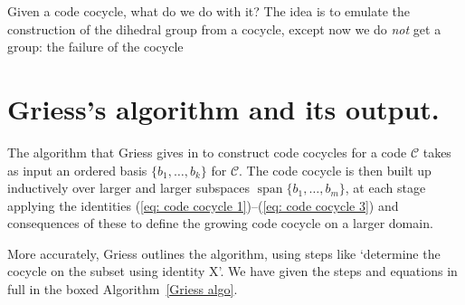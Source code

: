 \documentclass{article}
\theoremstyle{plain}
\theoremstyle{definition}
\def \cC {\mathcal{C}}
\DeclareMathOperator{\Span}{span}
\begin{document}
Given a code cocycle, what do we do with it? 
The idea is to emulate the construction of the dihedral group from a cocycle, except now we do \emph{not} get a group: the failure of the cocycle 

\section{Griess's algorithm and its output.}

The algorithm that Griess gives in \cite[Theorem 10]{Griess} to construct code cocycles for a code $\cC$ takes as input an ordered  basis $\{b_1,\ldots,b_k\}$ for $\cC$. 
The code cocycle is then built up inductively over larger and larger subspaces $\Span\{b_1,\ldots,b_m\}$, at each stage applying the identities (\ref{eq: code cocycle 1})--(\ref{eq: code cocycle 3}) and consequences of these to define the growing code cocycle on a larger domain.

More accurately, Griess outlines the algorithm, using steps like `determine the cocycle on the subset using identity X'. We have given the steps and equations in full in the boxed Algorithm~\ref{Griess algo}.


\end{document}
